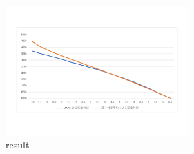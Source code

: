 \begin{figure}[htbp]
  \centering
    \includegraphics[width=70mm]{fig/result.pdf}
  \caption{result}
  \label{fig:result}
\end{figure}
